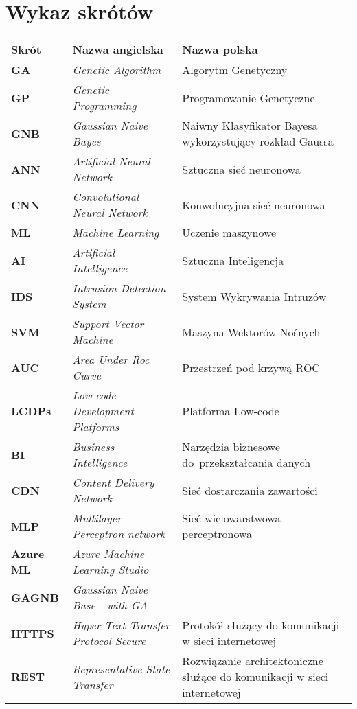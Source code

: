 \section*{Wykaz skrótów}

\begin{table}[H]
    \centering
    \begin{tabularx}{\linewidth}{lXX}
        \textbf{Skrót} & \textbf{Nazwa angielska} & \textbf{Nazwa polska} \\ \hline
        \textbf{GA} & \textit{Genetic Algorithm} & Algorytm Genetyczny \\ \hline
        \textbf{GP} & \textit{Genetic Programming} & Programowanie Genetyczne \\ \hline
        \textbf{GNB} & \textit{Gaussian Naive Bayes} & Naiwny Klasyfikator Bayesa wykorzystujący rozkład Gaussa \\ \hline
        \textbf{ANN} & \textit{Artificial Neural Network} & Sztuczna sieć neuronowa \\ \hline
        \textbf{CNN} & \textit{Convolutional Neural Network} & Konwolucyjna sieć neuronowa \\ \hline
        \textbf{ML} & \textit{Machine Learning} & Uczenie maszynowe \\ \hline
        \textbf{AI} & \textit{Artificial Intelligence} & Sztuczna Inteligencja \\ \hline
        \textbf{IDS} & \textit{Intrusion Detection System} & System Wykrywania Intruzów \\ \hline
        \textbf{SVM} & \textit{Support Vector Machine} & Maszyna Wektorów Nośnych \\ \hline
        \textbf{AUC} & \textit{Area Under Roc Curve} & Przestrzeń pod krzywą ROC \\ \hline
        \textbf{LCDPs} & \textit{Low-code Development Platforms} & Platforma Low-code \\ \hline
        \textbf{BI} & \textit{Business Intelligence} & Narzędzia biznesowe do~przekształcania danych \\ \hline
        \textbf{CDN} & \textit{Content Delivery Network} & Sieć dostarczania zawartości \\ \hline
        \textbf{MLP} & \textit{Multilayer Perceptron network} & Sieć wielowarstwowa perceptronowa \\ \hline
        \textbf{Azure ML} & \textit{Azure Machine Learning Studio} & \\ \hline
        \textbf{GAGNB} & \textit{Gaussian Naive Base - with GA} & \\ \hline
        \textbf{HTTPS} & \textit{Hyper Text Transfer Protocol Secure} & Protokół służący do komunikacji w sieci internetowej \\ \hline
        \textbf{REST} & \textit{Representative State Transfer} & Rozwiązanie architektoniczne służące do komunikacji w sieci internetowej \\ \hline
    \end{tabularx}
    \label{tab:shorts}
\end{table}